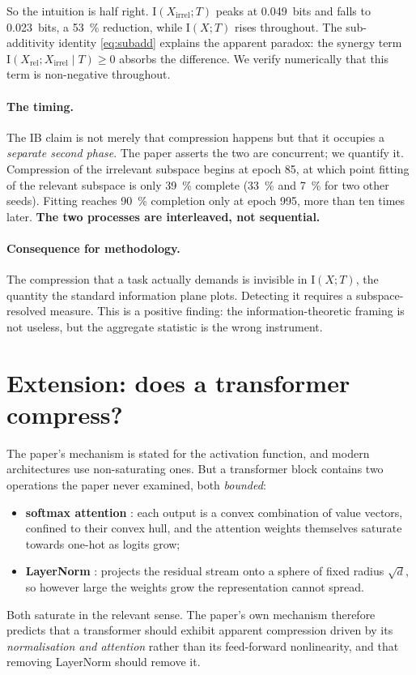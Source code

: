 \documentclass[11pt,a4paper]{article}
\newcommand{\I}{\mathrm{I}}
\begin{document}
So the intuition is half right. $\I(X_{\mathrm{irrel}};T)$ peaks at
\SI{0.049}{bits} and falls to \SI{0.023}{bits}, a \SI{53}{\percent} reduction,
while $\I(X;T)$ rises throughout. The sub-additivity identity \eqref{eq:subadd}
explains the apparent paradox: the synergy term
$\I(X_{\mathrm{rel}};X_{\mathrm{irrel}}\mid T)\ge 0$ absorbs the difference. We
verify numerically that this term is non-negative throughout.

\paragraph{The timing.} The IB claim is not merely that compression happens but
that it occupies a \emph{separate second phase}. The paper asserts the two are
concurrent; we quantify it. Compression of the irrelevant subspace begins at
epoch 85, at which point fitting of the relevant subspace is only
\SI{39}{\percent} complete (\SI{33}{\percent} and \SI{7}{\percent} for two other
seeds). Fitting reaches \SI{90}{\percent} completion only at epoch 995, more than
ten times later. \textbf{The two processes are interleaved, not sequential.}

\paragraph{Consequence for methodology.} The compression that a task actually
demands is invisible in $\I(X;T)$, the quantity the standard information plane
plots. Detecting it requires a subspace-resolved measure. This is a positive
finding: the information-theoretic framing is not useless, but the aggregate
statistic is the wrong instrument.

\section{Extension: does a transformer compress?}

The paper's mechanism is stated for the activation function, and modern
architectures use non-saturating ones. But a transformer block contains two
operations the paper never examined, both \emph{bounded}:
\begin{itemize}[topsep=2pt,itemsep=1pt]
  \item \textbf{softmax attention} \citep{vaswani2017attention}: each output is a
    convex combination of value vectors, confined to their convex hull, and the
    attention weights themselves saturate towards one-hot as logits grow;
  \item \textbf{LayerNorm} \citep{ba2016layer}: projects the residual stream onto
    a sphere of fixed radius $\sqrt{d}$, so however large the weights grow the
    representation cannot spread.
\end{itemize}
Both saturate in the relevant sense. The paper's own mechanism therefore predicts
that a transformer should exhibit apparent compression driven by its
\emph{normalisation and attention} rather than its feed-forward nonlinearity, and
that removing LayerNorm should remove it.
\end{document}
